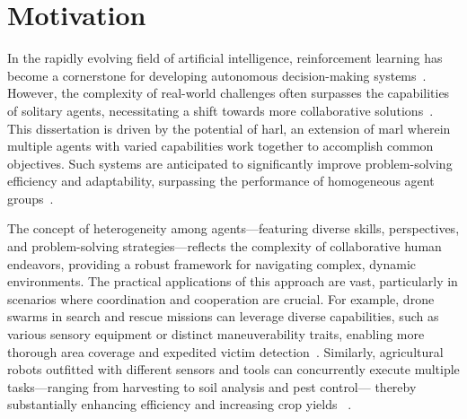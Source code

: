 \section{Motivation}%
\label{sec:motivation}

In the rapidly evolving field of artificial intelligence, reinforcement learning has become a 
cornerstone for developing autonomous decision-making systems~\cite{sutton2018}.
However, the complexity of real-world challenges often surpasses the capabilities of solitary agents,
necessitating a shift towards more collaborative solutions~\cite{cao2012}.
This dissertation is driven by the potential of \gls{harl}, an extension of \gls{marl}
wherein multiple agents with varied capabilities work together to accomplish common objectives. 
Such systems are anticipated to significantly improve problem-solving efficiency and adaptability, 
surpassing the performance of homogeneous agent groups~\cite{calvo2018}.

The concept of heterogeneity among agents—featuring diverse skills, perspectives, 
and problem-solving strategies—reflects the complexity of collaborative human endeavors, 
providing a robust framework for navigating complex, dynamic environments. 
The practical applications of this approach are vast, 
particularly in scenarios where coordination and cooperation are crucial. 
For example, drone swarms in search and rescue missions can leverage diverse capabilities, 
such as various sensory equipment or distinct maneuverability traits, 
enabling more thorough area coverage and expedited victim detection~\cite{hoang2023,kouzeghar2023}.
Similarly, agricultural robots outfitted with different sensors and tools can concurrently 
execute multiple tasks—ranging from harvesting to soil analysis and pest control—
thereby substantially enhancing efficiency and increasing crop yields~%
\cite{carbone2018,amarasinghe2019}.


